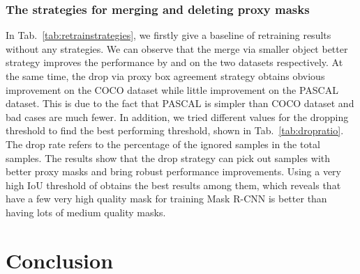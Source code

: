 \documentclass[final]{cvpr}
\begin{document}
\vspace{-3mm}
\subsubsection{The strategies for merging and deleting proxy masks}
\vspace{-1mm}

In Tab.~\ref{tab:retrainstrategies}, we firstly give a baseline of retraining results without any strategies. We can observe that the merge via smaller object better strategy improves the performance by   and   on the two datasets respectively. At the same time, the drop via proxy box agreement strategy obtains obvious improvement on the COCO dataset while little improvement on the PASCAL dataset. This is due to the fact that PASCAL is simpler than COCO dataset and bad cases are much fewer. In addition, we tried different values for the dropping threshold to find the best performing threshold, shown in Tab.~\ref{tab:dropratio}. The drop rate refers to the percentage of the ignored samples in the total samples. The results show that the drop strategy can pick out samples with better proxy masks and bring robust performance improvements. Using a very high IoU threshold of  obtains the best results among them, which reveals that have a few very high quality mask for training Mask R-CNN is better than having lots of medium quality masks.



\begin{table}[htbp]
\caption{COCO val results and the ratios of dropped masks when the dropping threshold varies.}
  \centering
\label{tab:dropratio}
\end{table}

\vspace{-3mm}
\section{Conclusion}
\vspace{-1mm}
\end{document}
